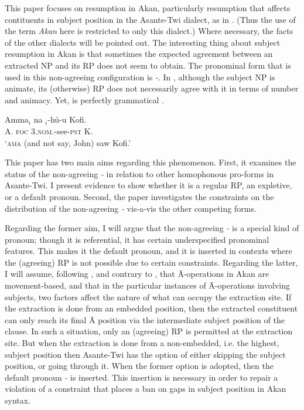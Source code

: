 \documentclass[output=paper]{LSP/langsci}
\begin{document}
This paper focuses on resumption in Akan, particularly resumption that affects contituents in subject position in the Asante-Twi dialect, as in . (Thus the use of the term \textit{Akan} here is restricted to only this dialect.) Where necessary, the facts of the other dialects will be pointed out. The interesting thing about  subject resumption  in Akan is that sometimes the expected agreement between an extracted NP and its RP does not seem to obtain. The pronominal form that is used in this non-agreeing configuration is \textit{\eer-}.  In , although the subject NP is animate, its (otherwise) RP does not necessarily  agree with it in terms of number and animacy.  Yet,  is perfectly grammatical \citep[but see][]{Marfo05}.

 
\ea\label{ex:korsah:3} 
\gll Amma$_i$ na  \eer$_i$-h\h u-u Kofi.\\
A.  \textsc{foc} \textsc{3.nom.-}see\textsc{-pst} K. \\
\glt `\textsc{ama}  (and not say, John) saw Kofi.'
\z

This paper has two main aims regarding this phenomenon. First, it examines the status of the non-agreeing \textit{\eer-} in relation to other homophonous pro-forms in Asante-Twi. I present evidence to show whether it is a regular RP, an expletive, or a default pronoun. Second, the paper investigates the constraints on the distribution of the non-agreeing \textit{\eer-} vis-\lw a-vis the other competing forms. 

Regarding the former aim, I will argue that the non-agreeing \textit{\eer-} is a special kind of pronoun; though it is referential, it has certain underspecified pronominal features. This makes it the default pronoun, and it is inserted in contexts where the (agreeing) RP is not possible due to certain constraints.
Regarding the latter, I will assume, following \cite{KorsahnMurphy15}, and contrary to  \cite{Saah94, Saah10}, that  \=A-operations in Akan are movement-based, and that in the particular instances of \=A-operations involving subjects, two factors affect the nature of what can occupy the extraction site. If the extraction is done from an embedded position,  then the extracted constituent can only reach its final   \=A position via the intermediate subject position of the clause. In such a situation, only an (agreeing) RP is permitted at the extraction site. But when the extraction is done from a non-embedded, i.e. the highest, subject position then Asante-Twi has the  option of either skipping the subject position, or going through it. 
When the former option is adopted, then the default pronoun  \textit{\eer-} is inserted. This insertion is necessary in order to repair a violation of a constraint that places a ban on gaps in subject position in Akan syntax.
\end{document}
